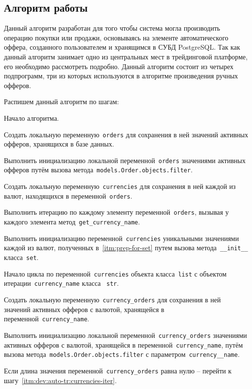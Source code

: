 \subsection{Алгоритм работы \moduleAutoTrading}
\label{subsec:dev:moduleautotrading}

Данный алгоритм разработан для того чтобы система могла производить операцию покупки или продажи, основываясь на
элементе автоматического оффера, созданного пользователем и хранящимся в СУБД PostgreSQL.
Так как данный алгоритм занимает одно из центральных мест в трейдинговой платформе, его необходимо рассмотреть подробно.
Данный алгоритм состоит из четырех подпрограмм, три из которых используются в алгоритме произведения ручных офферов.

Распишем данный алгоритм по шагам:
\begin{enumerate_step}
    \item Начало алгоритма.
    \item Создать локальную переменную~\lstinline{orders} для сохранения в ней значений активных офферов, хранящихся в базе данных.
    \item Выполнить инициализацию локальной переменной~\lstinline{orders} значениями активных офферов путём вызова метода~\lstinline{models.Order.objects.filter}.

    \item Создать локальную переменную~\lstinline{currencies} для сохранения в ней каждой из валют, находящихся в переменной~\lstinline{orders}.
    \item Выполнить итерацию по каждому элементу переменной~\lstinline{orders}, вызывая у каждого элемента метод~\lstinline{get_currency_name}.
    \item\label{itm:prep-for-set} Выполнить инициализацию переменной~\lstinline{currencies} уникальными значениями каждой из валют,
    полученных в~\ref{itm:prep-for-set} путем вызова метода~\lstinline{__init__} класса~\lstinline{set}.

    \item\label{itm:dev:auto-tr:currencies-iter} Начало цикла по переменной~\lstinline{currencies} объекта класса~\lstinline{list}
    с объектом итерации~\lstinline{currency_name} класса ~\lstinline{str}.
    \item Создать локальную переменную~\lstinline{currency_orders} для сохранения в ней значений активных офферов с валютой,
    хранящейся в переменной~\lstinline{currency_name}.
    \item Выполнить инициализацию локальной переменной~\lstinline{currency_orders} значениями активных офферов с валютой,
    хранящейся в переменной~\lstinline{currency_name}, путём вызова метода~\lstinline{models.Order.objects.filter} с параметром~\lstinline{currency__name}.
    \item Если длина значения переменной~\lstinline{currency_orders} равна нулю -- перейти к шагу~\ref{itm:dev:auto-tr:currencies-iter}.


\end{enumerate_step}
